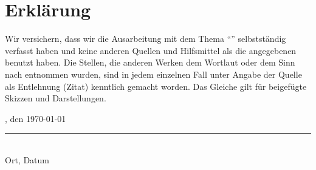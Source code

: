 \cleardoublepage%
\pagestyle{plain}

\chapter*{Erklärung}
Wir versichern, dass wir die Ausarbeitung mit dem Thema \enquote{\Subject} selbstständig verfasst haben und keine anderen Quellen und Hilfsmittel als die angegebenen benutzt haben.
Die Stellen, die anderen Werken dem Wortlaut oder dem Sinn nach entnommen wurden, sind in jedem einzelnen Fall unter Angabe der Quelle als Entlehnung (Zitat) kenntlich gemacht worden.
Das Gleiche gilt für beigefügte Skizzen und Darstellungen.\\[4cm]
\parbox{\textwidth}{%
    \parbox[b]{7cm}{%
        \Location, den \today\\[-0.3cm]
        \rule{6cm}{1pt}\\
        Ort, Datum
    }
    \hfill%
    \parbox[b]{7cm}{%
        \Signature%
    }
}
\\[0.5cm]
\parbox{\textwidth}{%
    \hfill%
    \parbox[b]{7cm}{%
        \SignatureZwei%
    }
}
